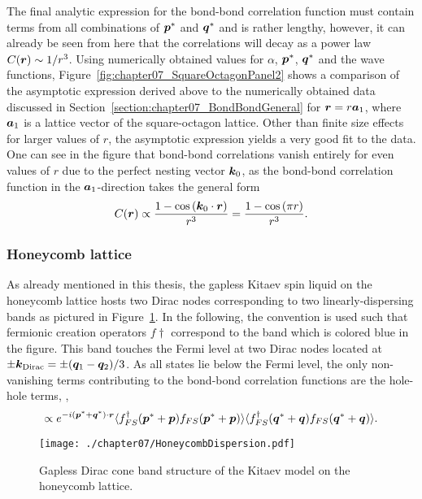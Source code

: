 The final analytic expression for the bond-bond correlation function must contain terms from all combinations of $\bm{p}^*$ and $\bm{q}^*$ and is rather lengthy, however, it can already be seen from here that the correlations will decay as a power law $C(\bm{r}) \sim 1/r^3$.
Using numerically obtained values for $\alpha$, $\bm{p}^*$, $\bm{q}^*$ and the wave functions, Figure~\ref{fig:chapter07_SquareOctagonPanel2} shows a comparison of the asymptotic expression derived above to the numerically obtained data discussed in Section~\ref{section:chapter07_BondBondGeneral} for $\bm{r} = r \bm{a}_1$, where $\bm{a}_1$ is a lattice vector of the square-octagon lattice.
Other than finite size effects for larger values of $r$, the asymptotic expression yields a very good fit to the data.
One can see in the figure that bond-bond correlations vanish entirely for even values of $r$ due to the perfect nesting vector $\bm{k}_0$, as the bond-bond correlation function in the $\bm{a}_1$-direction takes the general form
%
\begin{equation}
	C(\bm{r}) \propto \frac{1 - \cos{(\bm{k}_0 \cdot \bm{r})}}{r^3} = \frac{1 - \cos{(\pi r)}}{r^3}.
\end{equation}
%


%
%
\subsubsection{Honeycomb lattice}
\label{section:chapter07_BondBondHoneycomb}
%
%
As already mentioned in this thesis, the gapless Kitaev spin liquid on the honeycomb lattice hosts two Dirac nodes corresponding to two linearly-dispersing bands as pictured in Figure~\ref{fig:chapter07_HoneycombDispersion}.
In the following, the convention is used such that fermionic creation operators $f\dag$ correspond to the band which is colored blue in the figure.
This band touches the Fermi level at two Dirac nodes located at $\pm \bm{k}_{\rm Dirac} = \pm (\bm{q}_1 - \bm{q}_2)/3$.
As all states lie below the Fermi level, the only non-vanishing terms contributing to the bond-bond correlation functions are the hole-hole terms, \ie,
%
\begin{equation}
	\propto e^{-i (\bm{p}^* + \bm{q}^*) \cdot \bm{r}} \langle f^{\dagger}_{FS}(\bm{p}^* + \bm{p}) f_{FS}(\bm{p}^* + \bm{p}) \rangle \langle f^{\dagger}_{FS}(\bm{q}^* + \bm{q}) f_{FS}(\bm{q}^* + \bm{q}) \rangle.
\end{equation}
%
%
\begin{figure}[tb]
	\centering
	\texttt{[image: ./chapter07/HoneycombDispersion.pdf]}
	\caption{
		Gapless Dirac cone band structure of the Kitaev model on the honeycomb lattice.
	}
	\label{fig:chapter07_HoneycombDispersion}
\end{figure}
%

